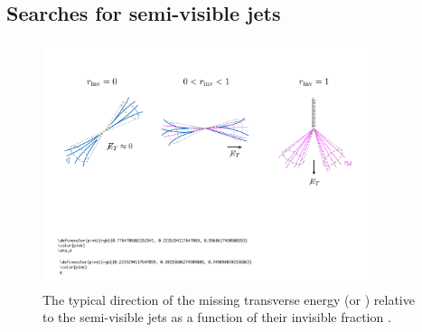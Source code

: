

\subsection{Searches for semi-visible jets}
\label{subsec:theory_svj}


\begin{figure}[htbp]
\centering
\includegraphics[width=0.85\textwidth]{figures/svj/metfigure.pdf}
\caption[The typical direction of the missing transverse energy relative to the semi-visible jets as a function of the invisible fraction \rinv]{The typical direction of the missing transverse energy \ETslash\xspace (or \ptmiss) relative to the semi-visible jets as a function of their invisible fraction \rinv \cite{Cohen:2017pzm}.}
\label{fig:theory_svj_met_dir}
\end{figure}

